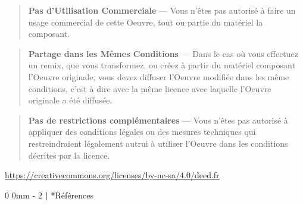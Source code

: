\documentclass[
  12pt,
]{report}
\makeatletter
\renewcommand{\chapter}{%
    \clearpage %
    \@startsection{chapter}%
    {0} %
    {0mm} %
    {-\baselineskip} %
    {2\baselineskip} %
    {\normalfont\Huge\bfseries | \Huge\bfseries}%
}
\makeatother
\begin{document}
\begin{tcolorbox}
\begin{quote}
 \textbf{Pas d'Utilisation Commerciale} ---
Vous n'êtes pas autorisé à faire un usage commercial de cette Oeuvre,
tout ou partie du matériel la composant.
\end{quote}

\vspace{1em}

\begin{quote}
 \textbf{Partage dans les Mêmes Conditions}
--- Dans le cas où vous effectuez un remix, que vous transformez, ou
créez à partir du matériel composant l'Oeuvre originale, vous devez
diffuser l'Oeuvre modifiée dans les même conditions, c'est à dire avec
la même licence avec laquelle l'Oeuvre originale a été diffusée.
\end{quote}

\vspace{1em}

\begin{quote}
\textbf{Pas de restrictions complémentaires} --- Vous n'êtes pas
autorisé à appliquer des conditions légales ou des mesures techniques
qui restreindraient légalement autrui à utiliser l'Oeuvre dans les
conditions décrites par la licence.
\end{quote}

\vspace{1em}

\url{https://creativecommons.org/licenses/by-nc-sa/4.0/deed.fr}

\end{tcolorbox}

\chapter*{Références}\label{ruxe9fuxe9rences}
\end{document}
